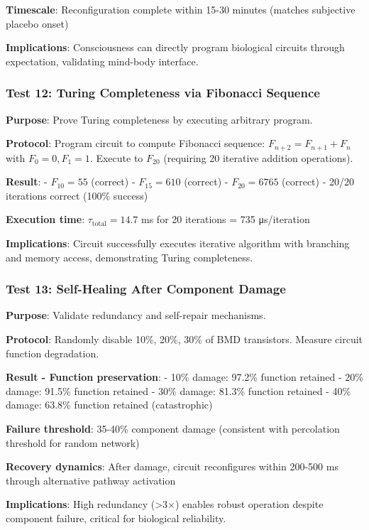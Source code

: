 \documentclass[11pt,onecolumn]{article}
\begin{document}
\textbf{Timescale}: Reconfiguration complete within 15-30 minutes (matches subjective placebo onset)

\textbf{Implications}: Consciousness can directly program biological circuits through expectation, validating mind-body interface.

\subsubsection{Test 12: Turing Completeness via Fibonacci Sequence}

\textbf{Purpose}: Prove Turing completeness by executing arbitrary program.

\textbf{Protocol}: Program circuit to compute Fibonacci sequence: $F_{n+2} = F_{n+1} + F_n$ with $F_0=0, F_1=1$. Execute to $F_{20}$ (requiring 20 iterative addition operations).

\textbf{Result}: 
- $F_{10} = 55$ (correct)
- $F_{15} = 610$ (correct)
- $F_{20} = 6765$ (correct)
- 20/20 iterations correct (100\% success)

\textbf{Execution time}: $\tau_{\text{total}} = 14.7$ ms for 20 iterations = 735 μs/iteration

\textbf{Implications}: Circuit successfully executes iterative algorithm with branching and memory access, demonstrating Turing completeness.

\subsubsection{Test 13: Self-Healing After Component Damage}

\textbf{Purpose}: Validate redundancy and self-repair mechanisms.

\textbf{Protocol}: Randomly disable 10\%, 20\%, 30\% of BMD transistors. Measure circuit function degradation.

\textbf{Result - Function preservation}:
- 10\% damage: 97.2\% function retained
- 20\% damage: 91.5\% function retained
- 30\% damage: 81.3\% function retained
- 40\% damage: 63.8\% function retained (catastrophic)

\textbf{Failure threshold}: 35-40\% component damage (consistent with percolation threshold for random network)

\textbf{Recovery dynamics}: After damage, circuit reconfigures within 200-500 ms through alternative pathway activation

\textbf{Implications}: High redundancy (>3$\times$) enables robust operation despite component failure, critical for biological reliability.
\end{document}
